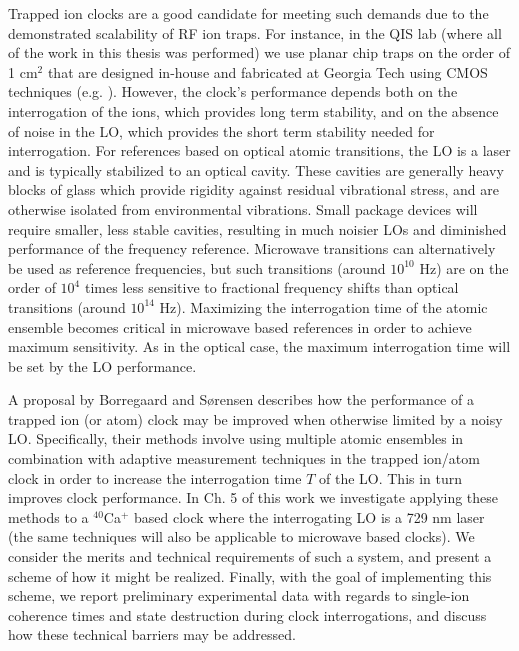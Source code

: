 Trapped ion clocks are a good candidate for meeting such demands due to the demonstrated scalability of RF ion traps. For instance, in the QIS lab (where all of the work in this thesis was performed) we use planar chip traps on the order of 1 cm$^2$ that are designed in-house and fabricated at Georgia Tech using CMOS techniques (e.g. \cite{IonTrap}). However, the clock's performance depends both on the interrogation of the ions, which provides long term stability, and on the absence of noise in the LO, which provides the short term stability needed for interrogation. For references based on optical atomic transitions, the LO is a laser and is typically stabilized to an optical cavity. These cavities are generally heavy blocks of glass which provide rigidity against residual vibrational stress, and are otherwise isolated from environmental vibrations. Small package devices will require smaller, less stable cavities, resulting in much noisier LOs and diminished performance of the frequency reference. Microwave transitions can alternatively be used as reference frequencies, but such transitions (around $10^{10}$ Hz) are on the order of $10^4$ times less sensitive to fractional frequency shifts than optical transitions (around $10^{14}$ Hz). Maximizing the interrogation time of the atomic ensemble becomes critical in microwave based references in order to achieve maximum sensitivity. As in the optical case, the maximum interrogation time will be set by the LO performance. 

A proposal by Borregaard and S\o{}rensen \cite{BorregaardSorensen} describes how the performance of a trapped ion (or atom) clock may be improved when otherwise limited by a noisy LO. Specifically, their methods involve using multiple atomic ensembles in combination with adaptive measurement techniques in the trapped ion/atom clock in order to increase the interrogation time $T$ of the LO. This in turn  improves clock performance. In Ch. 5 of this work we investigate applying these methods to a $^{40}$Ca$^+$ based clock where the interrogating LO is a 729 nm laser (the same techniques will also be applicable to microwave based clocks). We consider the merits and technical requirements of such a system, and present a scheme of how it might be realized. Finally, with the goal of implementing this scheme, we report preliminary experimental data with regards to single-ion coherence times and state destruction during clock interrogations, and discuss how these technical barriers may be addressed.

